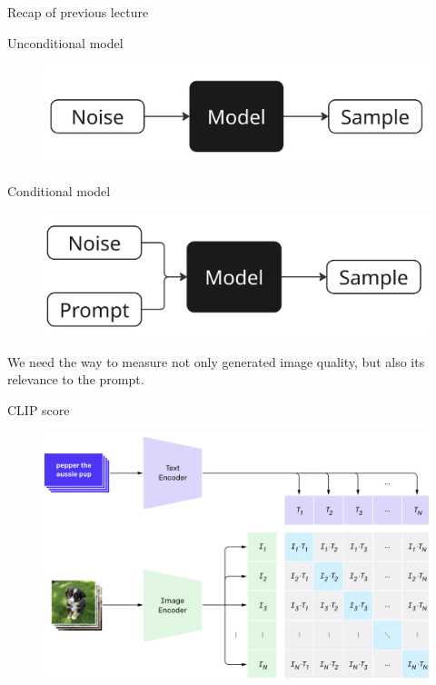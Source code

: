 \begin{frame}{Recap of previous lecture}
	\vspace{-0.2cm}
	\begin{minipage}{0.5\linewidth}
		\begin{block}{Unconditional model}
			\begin{figure}
				\includegraphics[width=0.95\linewidth]{figs/uncond_model}
			\end{figure}
		\end{block}
	\end{minipage}%
	\begin{minipage}{0.5\linewidth}
		\vspace{0.2cm}
		\begin{block}{Conditional model}
			\begin{figure}
				\includegraphics[width=0.95\linewidth]{figs/cond_model}
			\end{figure}
		\end{block}
	\end{minipage}
	We need the way to measure not only generated image quality, but also its relevance to the prompt.
	\begin{block}{CLIP score}
		\begin{figure}
			\includegraphics[width=0.5\linewidth]{figs/clip}
		\end{figure}
	\end{block}
\end{frame}
